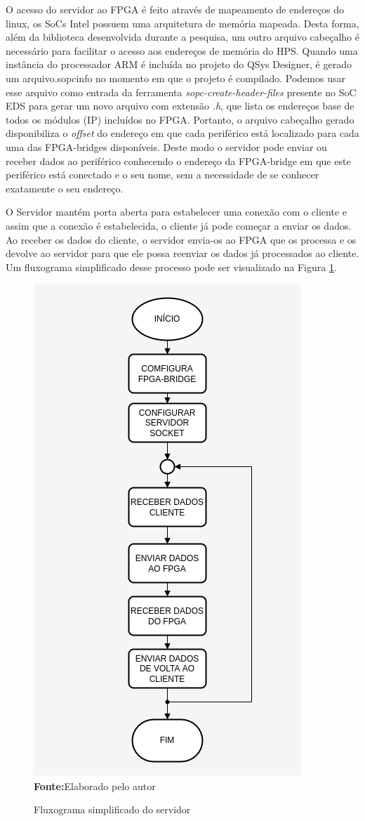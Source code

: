 O acesso do servidor ao FPGA é feito através de mapeamento de endereços do linux, os SoCs Intel possuem uma arquitetura de memória mapeada. Desta forma, além da biblioteca desenvolvida durante a pesquisa, um outro arquivo cabeçalho é necessário para facilitar o acesso aos endereços de memória do HPS\@. Quando uma instância do processador ARM é incluída no projeto do QSys Designer, é gerado um arquivo.sopcinfo no momento em que o projeto é compilado. Podemos usar esse arquivo como entrada da ferramenta \textit{sopc-create-header-files} presente no SoC EDS para gerar um novo arquivo com extensão \textit{.h}, que lista os endereços base de todos os módulos (IP) incluídos no FPGA\@. Portanto, o arquivo cabeçalho gerado disponibiliza o \textit{offset} do endereço em que cada periférico está localizado para cada uma das FPGA-bridges disponíveis. Deste modo o servidor pode enviar ou receber dados ao periférico conhecendo o endereço da FPGA-bridge em que este periférico está conectado e o seu nome, sem a necessidade de se conhecer exatamente o seu endereço.

O Servidor mantém porta aberta para estabelecer uma conexão com o cliente e assim que a conexão é estabelecida, o cliente já pode começar a enviar os dados. Ao receber os dados do cliente, o servidor envia-os ao FPGA que os processa e os devolve ao servidor para que ele possa reenviar os dados já processados ao cliente. Um fluxograma simplificado desse processo pode ser visualizado na Figura \ref{fig:fluxoServidor}.

\begin{figure}[ht]
	\caption{Fluxograma simplificado do servidor}
	\begin{center}
		\includegraphics[scale=0.47]{imagens/fluxogramaServidor.png}\\
		{\small \textbf{Fonte:}Elaborado pelo autor}
    \end{center}\label{fig:fluxoServidor}
\end{figure} 
